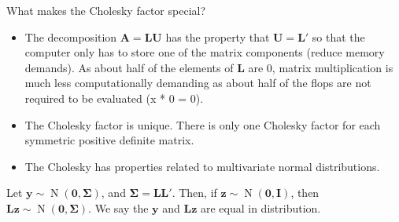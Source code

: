 \documentclass[
]{book}
\theoremstyle{definition}
\theoremstyle{definition}
\theoremstyle{definition}
\theoremstyle{definition}
\theoremstyle{remark}
\begin{document}
What makes the Cholesky factor special?

\begin{itemize}
\item
  The decomposition \(\mathbf{A} = \mathbf{L} \mathbf{U}\) has the property that \(\mathbf{U} = \mathbf{L}'\) so that the computer only has to store one of the matrix components (reduce memory demands). As about half of the elements of \(\mathbf{L}\) are 0, matrix multiplication is much less computationally demanding as about half of the flops are not required to be evaluated (x * 0 = 0).
\item
  The Cholesky factor is unique. There is only one Cholesky factor for each symmetric positive definite matrix.
\item
  The Cholesky has properties related to multivariate normal distributions.
\end{itemize}

Let \(\mathbf{y} \sim \operatorname{N}(\mathbf{0}, \boldsymbol{\Sigma})\), and \(\boldsymbol{\Sigma} = \mathbf{L} \mathbf{L}'\). Then, if \(\mathbf{z} \sim \operatorname{N}(\mathbf{0}, \mathbf{I})\), then \(\mathbf{L} \mathbf{z} \sim \operatorname{N}(\mathbf{0}, \boldsymbol{\Sigma})\). We say the \(\mathbf{y}\) and \(\mathbf{L}\mathbf{z}\) are equal in distribution.
\end{document}
